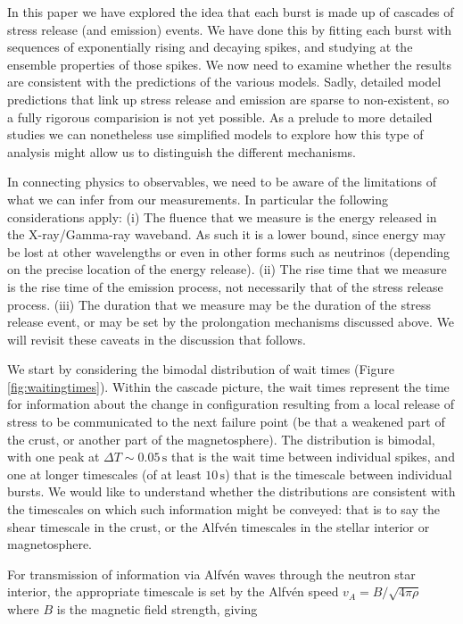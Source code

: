 \documentclass[12pt]{emulateapj}
\begin{document}
In this paper we have explored the idea that each burst is made up of cascades of stress release (and emission) events. We have done this by fitting each burst with sequences of exponentially rising and decaying spikes, and studying at the ensemble properties of those spikes. We now need to examine whether the results are consistent with the predictions of the various models. Sadly, detailed model predictions that link up stress release and emission are sparse to non-existent, so a fully rigorous comparision is not yet possible. As a prelude to more detailed studies we can nonetheless use simplified models to explore how this type of analysis might allow us to distinguish the different mechanisms.

In connecting physics to observables, we need to be aware of the limitations of what we can infer from our measurements. In particular the following considerations apply: (i) The fluence that we measure is the energy released in the X-ray/Gamma-ray waveband. As such it is a lower bound, since energy may be lost at other wavelengths or even in other forms such as neutrinos (depending on the precise location of the energy release). (ii) The rise time that we measure is the rise time of the emission process, not necessarily that of the stress release process. (iii) The duration that we measure may be the duration of the stress release event, or may be set by the prolongation mechanisms discussed above. We will revisit these caveats in the discussion that follows.

We start by considering the bimodal distribution of wait times (Figure \ref{fig:waitingtimes}). Within the cascade picture, the wait times represent the time for information about the change in configuration resulting from a local release of stress to be communicated to the next failure point (be that a weakened part of the crust, or another part of the magnetosphere). The distribution is bimodal, with one peak at $\Delta T\sim 0.05\,\mathrm{s}$ that is the wait time between individual spikes, and one at longer timescales (of at least $10\,\mathrm{s}$) that is the timescale between individual bursts. We would like to understand whether the distributions are consistent with the timescales on which such information might be conveyed: that is to say the shear timescale in the crust, or the Alfv\'en timescales in the stellar interior or magnetosphere.

For transmission of information via Alfv\'en waves through the neutron star interior, the appropriate timescale is set by the Alfv\'en speed $v_A = B/\sqrt{4\pi\rho}$ where $B$ is the magnetic field strength, giving
\end{document}
